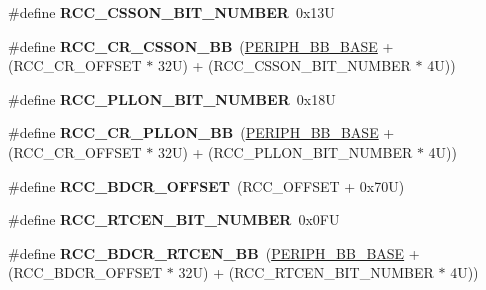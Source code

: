 \begin{DoxyCompactItemize}
\#define {\bfseries R\+C\+C\+\_\+\+C\+S\+S\+O\+N\+\_\+\+B\+I\+T\+\_\+\+N\+U\+M\+B\+ER}~0x13U
\item 
\mbox{\label{group___r_c_c___bit_address___alias_region_ga37c353c62ad303e661e99f20dcc6d1f0}} 
\#define {\bfseries R\+C\+C\+\_\+\+C\+R\+\_\+\+C\+S\+S\+O\+N\+\_\+\+BB}~(\mbox{\hyperlink{group___peripheral__memory__map_gaed7efc100877000845c236ccdc9e144a}{P\+E\+R\+I\+P\+H\+\_\+\+B\+B\+\_\+\+B\+A\+SE}} + (R\+C\+C\+\_\+\+C\+R\+\_\+\+O\+F\+F\+S\+ET $\ast$ 32\+U) + (\+R\+C\+C\+\_\+\+C\+S\+S\+O\+N\+\_\+\+B\+I\+T\+\_\+\+N\+U\+M\+B\+E\+R $\ast$ 4\+U))
\item 
\mbox{\label{group___r_c_c___bit_address___alias_region_gaed4c77e51cc821b9645cb7874bf5861b}} 
\#define {\bfseries R\+C\+C\+\_\+\+P\+L\+L\+O\+N\+\_\+\+B\+I\+T\+\_\+\+N\+U\+M\+B\+ER}~0x18U
\item 
\mbox{\label{group___r_c_c___bit_address___alias_region_ga0b0a8f171b66cc0d767716ba23ad3c6f}} 
\#define {\bfseries R\+C\+C\+\_\+\+C\+R\+\_\+\+P\+L\+L\+O\+N\+\_\+\+BB}~(\mbox{\hyperlink{group___peripheral__memory__map_gaed7efc100877000845c236ccdc9e144a}{P\+E\+R\+I\+P\+H\+\_\+\+B\+B\+\_\+\+B\+A\+SE}} + (R\+C\+C\+\_\+\+C\+R\+\_\+\+O\+F\+F\+S\+ET $\ast$ 32\+U) + (\+R\+C\+C\+\_\+\+P\+L\+L\+O\+N\+\_\+\+B\+I\+T\+\_\+\+N\+U\+M\+B\+E\+R $\ast$ 4\+U))
\item 
\mbox{\label{group___r_c_c___bit_address___alias_region_gaf234fe5d9628a3f0769721e76f83c566}} 
\#define {\bfseries R\+C\+C\+\_\+\+B\+D\+C\+R\+\_\+\+O\+F\+F\+S\+ET}~(R\+C\+C\+\_\+\+O\+F\+F\+S\+ET + 0x70\+U)
\item 
\mbox{\label{group___r_c_c___bit_address___alias_region_gac4074d20c157f0892c6effb8bf22c8d7}} 
\#define {\bfseries R\+C\+C\+\_\+\+R\+T\+C\+E\+N\+\_\+\+B\+I\+T\+\_\+\+N\+U\+M\+B\+ER}~0x0\+FU
\item 
\mbox{\label{group___r_c_c___bit_address___alias_region_ga583ba8653153b48a06473d0a331f781d}} 
\#define {\bfseries R\+C\+C\+\_\+\+B\+D\+C\+R\+\_\+\+R\+T\+C\+E\+N\+\_\+\+BB}~(\mbox{\hyperlink{group___peripheral__memory__map_gaed7efc100877000845c236ccdc9e144a}{P\+E\+R\+I\+P\+H\+\_\+\+B\+B\+\_\+\+B\+A\+SE}} + (R\+C\+C\+\_\+\+B\+D\+C\+R\+\_\+\+O\+F\+F\+S\+ET $\ast$ 32\+U) + (\+R\+C\+C\+\_\+\+R\+T\+C\+E\+N\+\_\+\+B\+I\+T\+\_\+\+N\+U\+M\+B\+E\+R $\ast$ 4\+U))

\end{DoxyCompactItemize}
